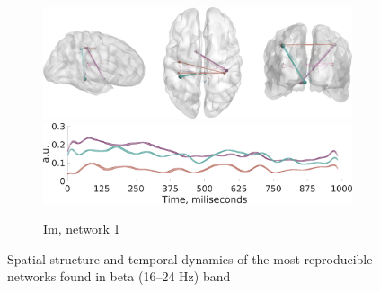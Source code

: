 \begin{figure}
\begin{subfigure}[b]{0.4\textwidth}
 \includegraphics[width=\textwidth]{../images/psiicos_paper/Figure12_c1.jpg}
 \includegraphics[width=\textwidth]{../images/psiicos_paper/Figure12_c2.jpg}

 \caption{Im, network 1}\label{fig:12c}
 \end{subfigure}
\caption{Spatial structure and temporal dynamics of the most reproducible
networks found in beta (16--24 Hz) band}\label{fig:12}
\end{figure} %

